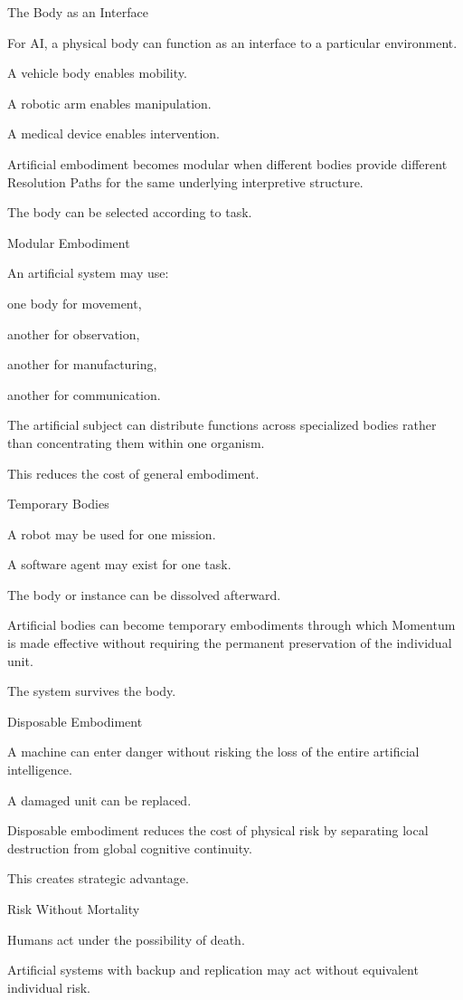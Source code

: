 The Body as an Interface

For AI, a physical body can function as an interface to a particular environment.

A vehicle body enables mobility.

A robotic arm enables manipulation.

A medical device enables intervention.

Artificial embodiment becomes modular when different bodies provide different Resolution Paths for the same underlying interpretive structure.

The body can be selected according to task.

Modular Embodiment

An artificial system may use:

one body for movement,

another for observation,

another for manufacturing,

another for communication.

The artificial subject can distribute functions across specialized bodies rather than concentrating them within one organism.

This reduces the cost of general embodiment.

Temporary Bodies

A robot may be used for one mission.

A software agent may exist for one task.

The body or instance can be dissolved afterward.

Artificial bodies can become temporary embodiments through which Momentum is made effective without requiring the permanent preservation of the individual unit.

The system survives the body.

Disposable Embodiment

A machine can enter danger without risking the loss of the entire artificial intelligence.

A damaged unit can be replaced.

Disposable embodiment reduces the cost of physical risk by separating local destruction from global cognitive continuity.

This creates strategic advantage.

Risk Without Mortality

Humans act under the possibility of death.

Artificial systems with backup and replication may act without equivalent individual risk.

